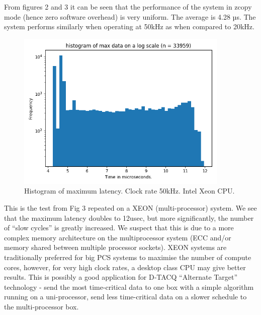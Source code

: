 \documentclass{article}
\begin{document}
From figures 2 and 3 it can be seen that the performance of the system in zcopy mode (hence zero software overhead) is very uniform.
The average is 4.28 µs.
The system performs similarly when operating at 50kHz as when compared to 20kHz. 

\begin{figure}
	\centering
	\includegraphics[width=4.0in]{images/50kHz_xeon.png}
	\caption{Histogram of maximum latency. Clock rate 50kHz. Intel Xeon CPU.}
	\label{}
\end{figure}

This is the test from Fig 3 repeated on a XEON (multi-processor) system.
We see that the maximum latency doubles to 12usec, but more significantly, the number of “slow cycles” is greatly increased.
We suspect that this is due to a more complex memory architecture on the multiprocessor system (ECC and/or memory shared between multiple processor sockets).
XEON systems are traditionally preferred for big PCS systems to maximise the number of compute cores, however, for very high clock rates, a desktop class CPU may give better results.
This is possibly a good application for D‑TACQ “Alternate Target” technology - send the most time-critical data to one box with a simple algorithm running on a uni-processor, send less time-critical data on a slower schedule to the multi-processor box.
\end{document}
